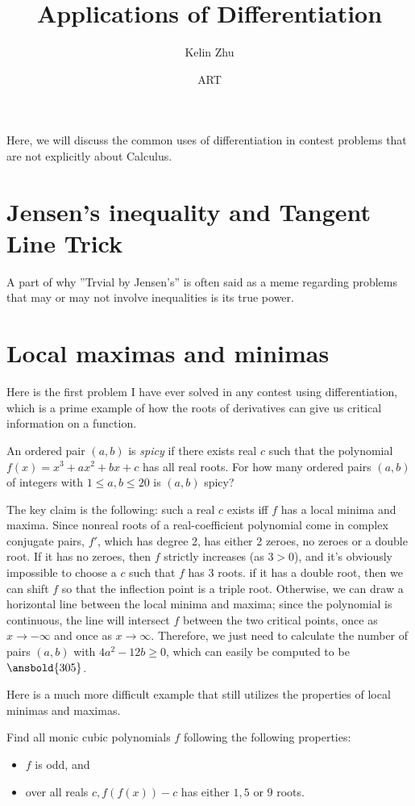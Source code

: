 \documentclass{article}
\title{Applications of Differentiation}
\author{Kelin Zhu}
\date{ART}
\begin{document}
\maketitle
Here, we will discuss the common uses of differentiation in contest problems that are not explicitly about Calculus.
\section{Jensen's inequality and Tangent Line Trick}
A part of why ''Trvial by Jensen's'' is often said as a meme regarding problems that may or may not involve inequalities is its true power.
\section{Local maximas and minimas}
Here is the first problem I have ever solved in any contest using differentiation, which is a prime example of how the roots of derivatives can give us critical information on a function.
\begin{exam}
An ordered pair $(a,b)$ is \textit{spicy} if there exists real $c$ such that the polynomial $f(x)=x^3+ax^2+bx+c$ has all real roots. For how many ordered pairs $(a,b)$ of integers with $1\le a,b\le 20$ is $(a,b)$ spicy?
\end{exam}
\begin{sol}
The key claim is the following: such a real $c$ exists iff $f$ has a local minima and maxima.
Since nonreal roots of a real-coefficient polynomial come in complex conjugate pairs, $f'$, which has degree 2, has either 2 zeroes, no zeroes or a double root.
If it has no zeroes, then $f$ strictly increases (as $3>0$), and it's obviously impossible to choose a $c$ such that $f$ has 3 roots.
if it has a double root, then we can shift $f$ so that the inflection point is a triple root.
Otherwise, we can draw a horizontal line between the local minima and maxima; since the polynomial is continuous, the line will intersect $f$ between the two critical points, once as $x\rightarrow -\infty$ and once as $x\rightarrow \infty$.
Therefore, we just need to calculate the number of pairs $(a,b)$ with $4a^2-12b\ge 0$, which can easily be computed to be $\ansbold{305}$.
\end{sol}
Here is a much more difficult example that still utilizes the properties of local minimas and maximas.
\begin{exam}
Find all monic cubic polynomials $f$ following the following properties:
\begin{itemize}
\item $f$ is odd, and
\item over all reals $c, f(f(x))-c$ has either $1, 5$ or $9$ roots.
\end{itemize}
\end{exam}
\end{document}
